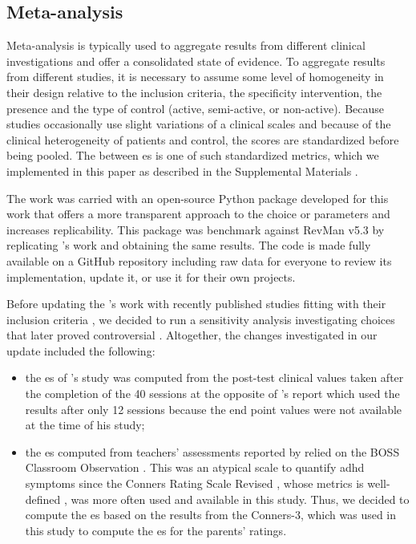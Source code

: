 \subsection{Meta-analysis}

Meta-analysis is typically used to aggregate results from different clinical investigations and offer a 
consolidated state of evidence. To aggregate results from different studies, it is necessary to assume 
some level of homogeneity in their design relative to the inclusion criteria, the specificity intervention, 
the presence and the type of control (active, semi-active, or non-active). Because studies occasionally 
use slight variations of a clinical scales and because of the clinical heterogeneity of patients and control, 
the scores are standardized before being pooled. The between \gls{es} is one of such standardized metrics, 
which we implemented in this paper as described in the Supplemental Materials \citep{Supplementalmaterial}. 

The work was carried with an open-source Python package developed for this work that offers a more transparent 
approach to the choice or parameters and increases replicability. This package was benchmark against 
RevMan v5.3 \citep{RevMan} by replicating \citet{Cortese2016}'s work and obtaining the same results. 
The code is made fully available on a GitHub repository \citep{Bussalb2018} including raw data for everyone 
to review its implementation, update it, or use it for their own projects. 
 
Before updating the \citet{Cortese2016}'s work with recently published studies fitting with their inclusion 
criteria \citep{Strehl2017, Baumeister2016}, we decided to run a sensitivity analysis investigating choices 
that later proved controversial \citep{Micoulaud2016}. Altogether, the changes investigated in our update 
included the following:
\begin{itemize}
\item the \gls{es} of \citeauthor{Arnold2014}'s study was computed from the post-test clinical values taken 
after the completion of the 40 sessions at the opposite of \citet{Cortese2016}'s report which used the results 
after only 12 sessions because the end point values were not available at the time of his study;
\item the \gls{es} computed from teachers' assessments reported by \citet{Steiner2014} relied on the BOSS 
Classroom Observation \citep{Shapiro2010}. This was an atypical scale to quantify \gls{adhd} symptoms since 
the Conners Rating Scale Revised \citep{Conners1998} \citep{Christiansen2014, Bluschke2016}, whose metrics is 
well-defined \citep{Collett2003, Epstein2012}, was more often used and available in this study. Thus, we decided 
to compute the \gls{es} based on the results from the Conners-3, which was used in this study to compute the 
\gls{es} for the parents' ratings.  
\end{itemize} 

